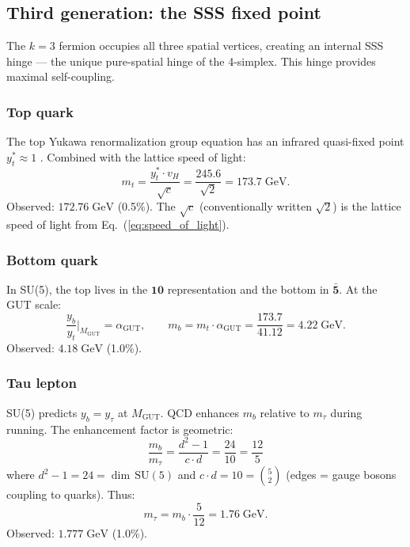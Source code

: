 \subsection{Third generation: the SSS fixed point}

The $k = 3$ fermion occupies all three spatial vertices, creating an internal SSS hinge --- the unique pure-spatial hinge of the 4-simplex. This hinge provides maximal self-coupling.

\subsubsection{Top quark}

The top Yukawa renormalization group equation has an infrared quasi-fixed point $y^*_t \approx 1$ \cite{Pendleton, Hill}. Combined with the lattice speed of light:
\begin{equation}
m_t = \frac{y^*_t \cdot v_H}{\sqrt{c}} = \frac{245.6}{\sqrt{2}} = 173.7\;\text{GeV}.
\end{equation}
Observed: $172.76\;\text{GeV}$ (0.5\%). The $\sqrt{c}$ (conventionally written $\sqrt{2}$) is the lattice speed of light from Eq.~(\ref{eq:speed_of_light}).

\subsubsection{Bottom quark}

In SU(5), the top lives in the $\mathbf{10}$ representation and the bottom in $\bar{\mathbf{5}}$. At the GUT scale:
\begin{equation}
\frac{y_b}{y_t}\bigg|_{M_\text{GUT}} = \alpha_\text{GUT}, \qquad m_b = m_t \cdot \alpha_\text{GUT} = \frac{173.7}{41.12} = 4.22\;\text{GeV}.
\end{equation}
Observed: $4.18\;\text{GeV}$ (1.0\%).

\subsubsection{Tau lepton}

SU(5) predicts $y_b = y_\tau$ at $M_\text{GUT}$. QCD enhances $m_b$ relative to $m_\tau$ during running. The enhancement factor is geometric:
\begin{equation}
\frac{m_b}{m_\tau} = \frac{d^2 - 1}{c \cdot d} = \frac{24}{10} = \frac{12}{5}
\end{equation}
where $d^2 - 1 = 24 = \dim\,\text{SU}(5)$ and $c \cdot d = 10 = \binom{5}{2}$ (edges = gauge bosons coupling to quarks). Thus:
\begin{equation}
m_\tau = m_b \cdot \frac{5}{12} = 1.76\;\text{GeV}.
\end{equation}
Observed: $1.777\;\text{GeV}$ (1.0\%).

